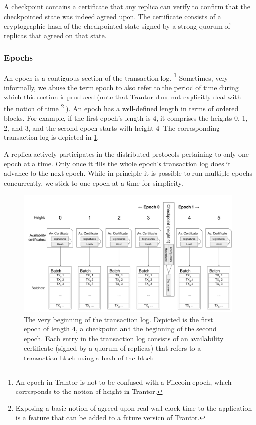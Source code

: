 \documentclass{article}
\begin{document}
A checkpoint contains a certificate that any replica can verify
to confirm that the checkpointed state was indeed agreed upon.
The certificate consists of a cryptographic hash of the checkpointed state
signed by a strong quorum of replicas that agreed on that state.

\subsubsection{Epochs}

An epoch is a contiguous section of the transaction log.%
\footnote{An epoch in Trantor is not to be confused with a Filecoin epoch,
which corresponds to the notion of height in Trantor.}
Sometimes, very informally, we abuse the term epoch to also refer to the period of time
during which this section is produced (note that Trantor does not explicitly deal with the notion of time%
\footnote{Exposing a basic notion of agreed-upon real wall clock time to the application
is a feature that can be added to a future version of Trantor.}
).
An epoch has a well-defined length in terms of ordered blocks.
For example, if the first epoch’s length is 4, it comprises the heights 0, 1, 2, and 3,
and the second epoch starts with height 4.
The corresponding transaction log is depicted in \cref{fig:transaction-log}.

A replica actively participates in the distributed protocols pertaining to only one epoch at a time.
Only once it fills the whole epoch’s transaction log does it advance to the next epoch.
While in principle it is possible to run multiple epochs concurrently, we stick to one epoch at a time for simplicity.

\begin{figure}[h]
    \centering
    \includegraphics[width=\textwidth]{figures/transaction-log}
    \caption{The very beginning of the transaction log.
    Depicted is the first epoch of length 4, a checkpoint and the beginning of the second epoch.
    Each entry in the transaction log consists of an availability certificate (signed by a quorum of replicas)
    that refers to a transaction block using a hash of the block.}
    \label{fig:transaction-log}
\end{figure}
\end{document}
